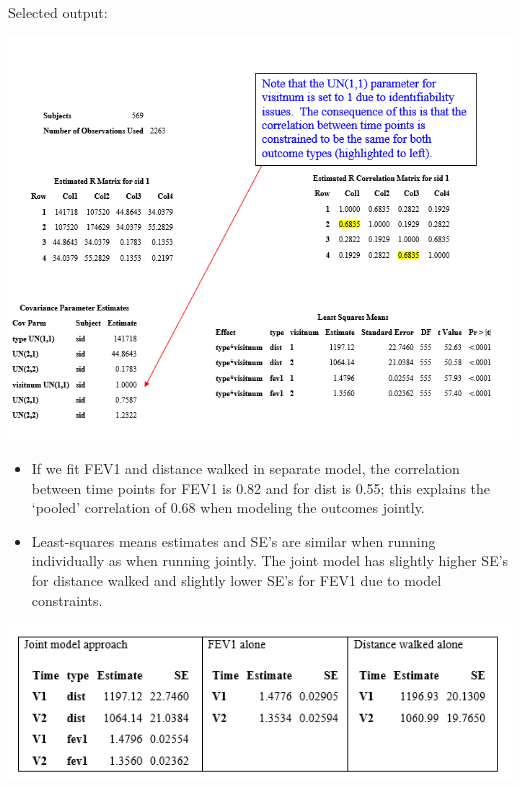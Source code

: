 \documentclass[
  9pt,
  ignorenonframetext,
]{beamer}
\begin{document}
\begin{frame}{Selected output:}
\protect\hypertarget{selected-output}{}
\begin{center}\includegraphics[width=1\linewidth]{figs_L8/f6} \end{center}
\end{frame}

\begin{frame}{}
\protect\hypertarget{section-7}{}
\begin{itemize}
\item
  If we fit FEV1 and distance walked in separate model, the correlation
  between time points for FEV1 is 0.82 and for dist is 0.55; this
  explains the `pooled' correlation of 0.68 when modeling the outcomes
  jointly.
\item
  Least-squares means estimates and SE's are similar when running
  individually as when running jointly. The joint model has slightly
  higher SE's for distance walked and slightly lower SE's for FEV1 due
  to model constraints.
\end{itemize}

\begin{center}\includegraphics[width=1\linewidth]{figs_L8/f7} \end{center}
\end{frame}
\end{document}
